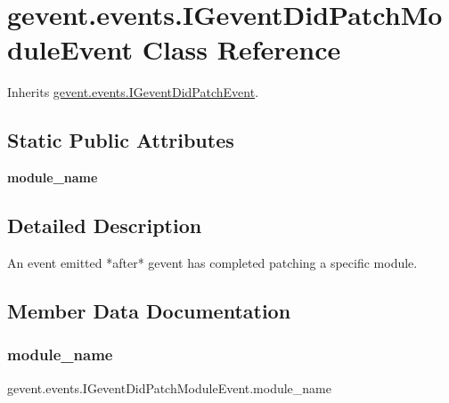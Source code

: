 \hypertarget{classgevent_1_1events_1_1_i_gevent_did_patch_module_event}{}\section{gevent.\+events.\+I\+Gevent\+Did\+Patch\+Module\+Event Class Reference}
\label{classgevent_1_1events_1_1_i_gevent_did_patch_module_event}


Inherits \hyperlink{classgevent_1_1events_1_1_i_gevent_did_patch_event}{gevent.\+events.\+I\+Gevent\+Did\+Patch\+Event}.

\subsection*{Static Public Attributes}
\begin{DoxyCompactItemize}
\item 
{\bfseries module\+\_\+name}
\end{DoxyCompactItemize}


\subsection{Detailed Description}
\begin{DoxyVerb}An event emitted *after* gevent has completed patching a specific
module.
\end{DoxyVerb}
 

\subsection{Member Data Documentation}
\mbox{\label{classgevent_1_1events_1_1_i_gevent_did_patch_module_event_a1880865238329c8ecc09eaa22009f15a}} 
\subsubsection{\texorpdfstring{module\+\_\+name}{module\_name}}
{\footnotesize\ttfamily gevent.\+events.\+I\+Gevent\+Did\+Patch\+Module\+Event.\+module\+\_\+name\hspace{0.3cm}{\ttfamily [static]}}

